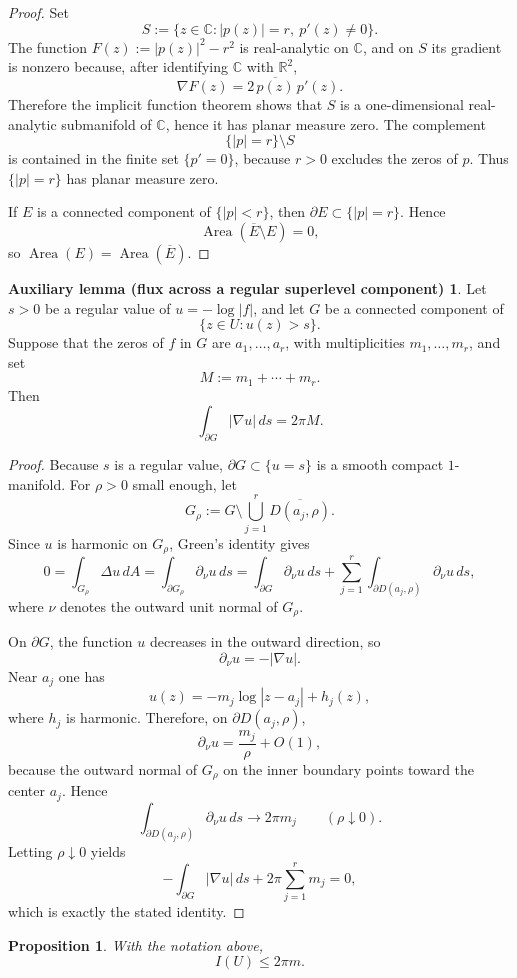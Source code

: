 \documentclass[12pt]{amsart}
\theoremstyle{definition}
\newtheorem{proposition}[theorem]{Proposition}
\newtheorem*{auxlemma}{Auxiliary lemma (flux across a regular superlevel component)}
\theoremstyle{remark}
\begin{document}
\begin{proof} Set
\[
S:=\{z\in \mathbb{C}: |p(z)|=r,\ p'(z)\neq 0\}.
\]
The function $F(z):=|p(z)|^2-r^2$ is real-analytic on $\mathbb{C}$, and on $S$ its gradient is nonzero because,
after identifying $\mathbb{C}$ with $\mathbb{R}^2$,
\[
\nabla F(z)=2\,\overline{p(z)}\,p'(z).
\]
Therefore the implicit function theorem shows that $S$ is a one-dimensional real-analytic submanifold
of $\mathbb{C}$, hence it has planar measure zero. The complement
\[
\{|p|=r\}\setminus S
\]
is contained in the finite set $\{p'=0\}$, because $r>0$ excludes the zeros of $p$. Thus $\{|p|=r\}$ has
planar measure zero.

\indent If $E$ is a connected component of $\{|p|<r\}$, then $\partial E\subset\{|p|=r\}$. Hence
\[
\operatorname{Area}(\overline E\setminus E)=0,
\]
so $\operatorname{Area}(E)=\operatorname{Area}(\overline E)$. \end{proof}

\medskip
\begin{auxlemma}
Let $s>0$ be a regular value of $u=-\log|f|$, and let $G$ be a connected component of
\[
\{z\in U:u(z)>s\}.
\]
Suppose that the zeros of $f$ in $G$ are $a_1,\dots,a_r$, with multiplicities $m_1,\dots,m_r$, and set
\[
M:=m_1+\cdots+m_r.
\]
Then
\[
\int_{\partial G} |\nabla u|\,ds = 2\pi M.
\]
\end{auxlemma}

\begin{proof} Because $s$ is a regular value, $\partial G\subset\{u=s\}$ is a smooth compact $1$-manifold. For $\rho>0$ small enough, let
\[
G_\rho:=G\setminus \bigcup_{j=1}^r \overline{D(a_j,\rho)}.
\]
Since $u$ is harmonic on $G_\rho$, Green's identity gives
\[
0=\int_{G_\rho}\Delta u\,dA
  =\int_{\partial G_\rho}\partial_\nu u\,ds
  =\int_{\partial G}\partial_\nu u\,ds
   +\sum_{j=1}^r \int_{\partial D(a_j,\rho)} \partial_\nu u\,ds,
\]
where $\nu$ denotes the outward unit normal of $G_\rho$.

On $\partial G$, the function $u$ decreases in the outward direction, so
\[
\partial_\nu u=-|\nabla u|.
\]
Near $a_j$ one has
\[
u(z)=-m_j\log|z-a_j|+h_j(z),
\]
where $h_j$ is harmonic. Therefore, on $\partial D(a_j,\rho)$,
\[
\partial_\nu u=\frac{m_j}{\rho}+O(1),
\]
because the outward normal of $G_\rho$ on the inner boundary points toward the center $a_j$. Hence
\[
\int_{\partial D(a_j,\rho)} \partial_\nu u\,ds \to 2\pi m_j
\qquad (\rho\downarrow 0).
\]
Letting $\rho\downarrow 0$ yields
\[
-\int_{\partial G}|\nabla u|\,ds + 2\pi\sum_{j=1}^r m_j = 0,
\]
which is exactly the stated identity. \end{proof}
\medskip
\begin{proposition}\label{prop:basic-integral-bound}
\emph{With the notation above,}
\[
I(U)\le 2\pi m.
\]
\end{proposition}
\end{document}
